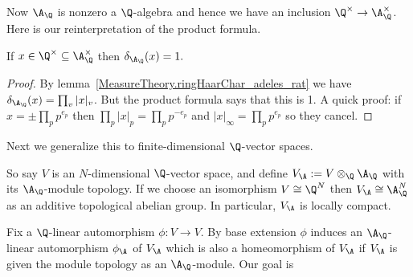 Now $\A_{\Q}$ is nonzero a $\Q$-algebra and hence we have an inclusion $\Q^\times\to\A_{\Q}^\times$.
Here is our reinterpretation of the product formula.

\begin{lemma}
  \label{MeasureTheory.ringHaarChar_adeles_units_rat_eq_one}
  If $x\in\Q^\times\subseteq\A_{\Q}^\times$ then $\delta_{\A_{\Q}}(x)=1.$
\end{lemma}
\begin{proof}
  By lemma~\ref{MeasureTheory.ringHaarChar_adeles_rat} we have $\delta_{\A_{\Q}}(x)=\prod_v|x|_v$.
  But the product formula says that this is 1.
  A quick proof: if $x=\pm\prod_pp^{e_p}$ then $\prod_p|x|_p=\prod_pp^{-e_p}$
  and $|x|_\infty=\prod_pp^{e_p}$ so they cancel.
\end{proof}

  Next we generalize this to finite-dimensional $\Q$-vector spaces.

  So say $V$ is an $N$-dimensional $\Q$-vector space,
  and define $V_{\A}:= V\otimes_{\Q}\A_{\Q}$ with its $\A_{\Q}$-module topology.
  If we choose an isomorphism $V\cong\Q^N$ then $V_{\A}\cong\A_{\Q}^N$
  as an additive topological abelian group. In particular, $V_{\A}$ is locally compact.

  Fix a $\Q$-linear automorphism $\phi:V\to V$. By base extension $\phi$ induces
  an $\A_{\Q}$-linear automorphism $\phi_{\A}$ of $V_{\A}$ which is also a homeomorphism of $V_{\A}$
  if $V_{\A}$ is given the module topology as an $\A_{\Q}$-module. Our goal is

